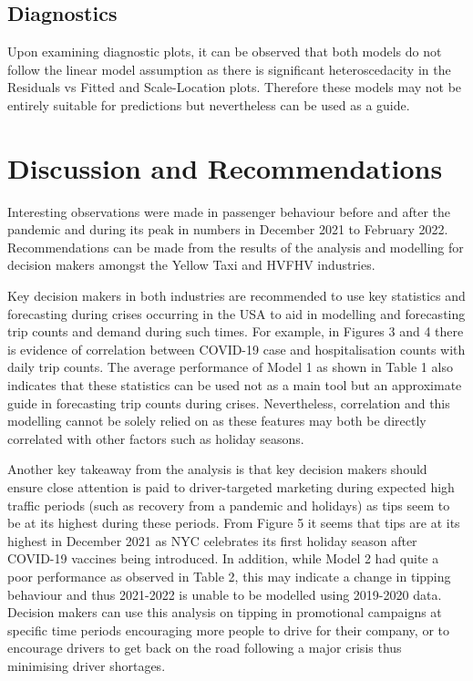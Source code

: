 \documentclass[11pt]{article}
\begin{document}
\subsection{Diagnostics}

Upon examining diagnostic plots, it can be observed that both models do not follow the linear model assumption as there is significant heteroscedacity in the Residuals vs Fitted and Scale-Location plots. Therefore these models may not be entirely suitable for predictions but nevertheless can be used as a guide.

\section{Discussion and Recommendations}
Interesting observations were made in passenger behaviour before and after the pandemic and during its peak in numbers in December 2021 to February 2022. Recommendations can be made from the results of the analysis and modelling for decision makers amongst the Yellow Taxi and HVFHV industries.

Key decision makers in both industries are recommended to use key statistics and forecasting during crises occurring in the USA to aid in modelling and forecasting trip counts and demand during such times. For example, in Figures 3 and 4 there is evidence of correlation between COVID-19 case and hospitalisation counts with daily trip counts. The average performance of Model 1 as shown in Table 1 also indicates that these statistics can be used not as a main tool but an approximate guide in forecasting trip counts during crises. Nevertheless, correlation and this modelling cannot be solely relied on as these features may both be directly correlated with other factors such as holiday seasons.

Another key takeaway from the analysis is that key decision makers should ensure close attention is paid to driver-targeted marketing during expected high traffic periods (such as recovery from a pandemic and holidays) as tips seem to be at its highest during these periods. From Figure 5 it seems that tips are at its highest in December 2021 as NYC celebrates its first holiday season after COVID-19 vaccines being introduced. In addition, while Model 2 had quite a poor performance as observed in Table 2, this may indicate a change in tipping behaviour and thus 2021-2022 is unable to be modelled using 2019-2020 data. Decision makers can use this analysis on tipping in promotional campaigns at specific time periods encouraging more people to drive for their company, or to encourage drivers to get back on the road following a major crisis thus minimising driver shortages. 
\end{document}
